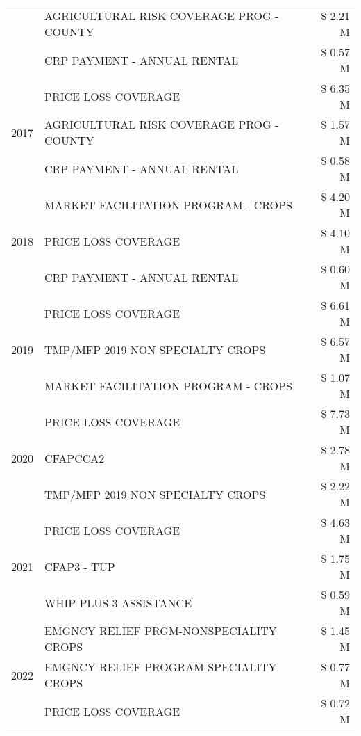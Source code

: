 \begin{tabular}{llr}
 & AGRICULTURAL RISK COVERAGE PROG - COUNTY & \$ 2.21 M \\
 & CRP PAYMENT - ANNUAL RENTAL & \$ 0.57 M \\
\cline{1-3}
\multirow[t]{3}{*}{2017} & PRICE LOSS COVERAGE & \$ 6.35 M \\
 & AGRICULTURAL RISK COVERAGE PROG - COUNTY & \$ 1.57 M \\
 & CRP PAYMENT - ANNUAL RENTAL & \$ 0.58 M \\
\cline{1-3}
\multirow[t]{3}{*}{2018} & MARKET FACILITATION PROGRAM - CROPS & \$ 4.20 M \\
 & PRICE LOSS COVERAGE & \$ 4.10 M \\
 & CRP PAYMENT - ANNUAL RENTAL & \$ 0.60 M \\
\cline{1-3}
\multirow[t]{3}{*}{2019} & PRICE LOSS COVERAGE & \$ 6.61 M \\
 & TMP/MFP 2019 NON SPECIALTY CROPS & \$ 6.57 M \\
 & MARKET FACILITATION PROGRAM - CROPS & \$ 1.07 M \\
\cline{1-3}
\multirow[t]{3}{*}{2020} & PRICE LOSS COVERAGE & \$ 7.73 M \\
 & CFAPCCA2 & \$ 2.78 M \\
 & TMP/MFP 2019 NON SPECIALTY CROPS & \$ 2.22 M \\
\cline{1-3}
\multirow[t]{3}{*}{2021} & PRICE LOSS COVERAGE & \$ 4.63 M \\
 & CFAP3 - TUP & \$ 1.75 M \\
 & WHIP PLUS 3 ASSISTANCE & \$ 0.59 M \\
\cline{1-3}
\multirow[t]{3}{*}{2022} & EMGNCY RELIEF PRGM-NONSPECIALITY CROPS & \$ 1.45 M \\
 & EMGNCY RELIEF PROGRAM-SPECIALITY CROPS & \$ 0.77 M \\
 & PRICE LOSS COVERAGE & \$ 0.72 M \\
\cline{1-3}
\bottomrule
\end{tabular}
